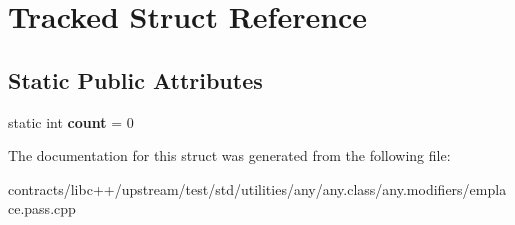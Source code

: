 \hypertarget{struct_tracked}{}\section{Tracked Struct Reference}
\label{struct_tracked}
\subsection*{Static Public Attributes}
\begin{DoxyCompactItemize}
\item 
\mbox{\label{struct_tracked_af813d8d958613d17d2f3577687283bcf}} 
static int {\bfseries count} = 0
\end{DoxyCompactItemize}


The documentation for this struct was generated from the following file\+:\begin{DoxyCompactItemize}
\item 
contracts/libc++/upstream/test/std/utilities/any/any.\+class/any.\+modifiers/emplace.\+pass.\+cpp\end{DoxyCompactItemize}
